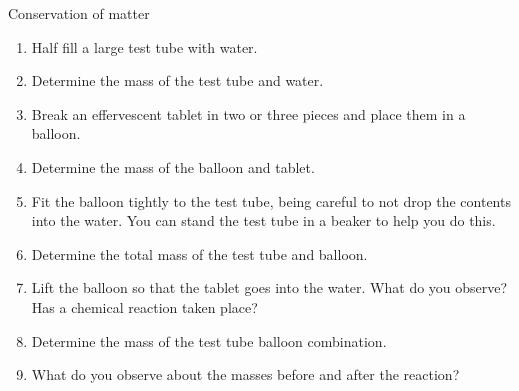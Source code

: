 \begin{i_experiment}{Conservation of matter}
\begin{minipage}{.7\textwidth}
\begin{enumerate}[noitemsep, label=\textbf{\arabic*}. ]
\item Half fill a large test tube with water.
\item Determine the mass of the test tube and water.
\item Break an effervescent tablet in two or three pieces and place them in a balloon.
\item Determine the mass of the balloon and tablet.
\item Fit the balloon tightly to the test tube, being careful to not drop the contents into the water. You can stand the test tube in a beaker to help you do this.
\item Determine the total mass of the test tube and balloon.
\item Lift the balloon so that the tablet goes into the water. What do you observe? Has a chemical reaction taken place?
\item Determine the mass of the test tube balloon combination.
\item What do you observe about the masses before and after the reaction?
\end{enumerate}
\end{minipage}
\begin{minipage}{.2\textwidth}
 \begin{center}
\end{center}
\end{minipage}
\end{i_experiment}
